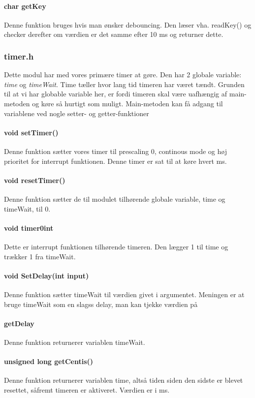 \paragraph{char getKey}
Denne funktion bruges hvis man ønsker debouncing. Den læser vha. readKey() og checker derefter om værdien er det samme efter 10 ms og returner dette.
\subsubsection{timer.h}
Dette modul har med vores primære timer at gøre. Den har 2 globale variable: \textit{time} og \textit{timeWait}. Time tæller hvor lang tid timeren har været tændt. Grunden til at vi har globable variable her, er fordi timeren skal være uafhængig af main-metoden og køre så hurtigt som muligt. Main-metoden kan få adgang til variablene ved nogle setter- og getter-funktioner
\paragraph{void setTimer()}
Denne funktion sætter vores timer til prescaling 0, continous mode og høj prioritet for interrupt funktionen. Denne timer er sat til at køre hvert ms.
\paragraph{void resetTimer()}
Denne funktion sætter de til modulet tilhørende globale variable, time og timeWait, til 0.
\paragraph{void timer0int}
Dette er interrupt funktionen tilhørende timeren. Den lægger 1 til time og trækker 1 fra timeWait. 
\paragraph{void SetDelay(int input)}
Denne funktion sætter timeWait til værdien givet i argumentet. Meningen er at bruge timeWait som en slagss delay, man kan tjekke værdien på
\paragraph{getDelay}
Denne funktion returnerer variablen timeWait.
\paragraph{unsigned long getCentis()}
Denne funktion returnerer variablen time, altså tiden siden den sidste er blevet resettet, såfremt timeren er aktiveret. Værdien er i ms.

